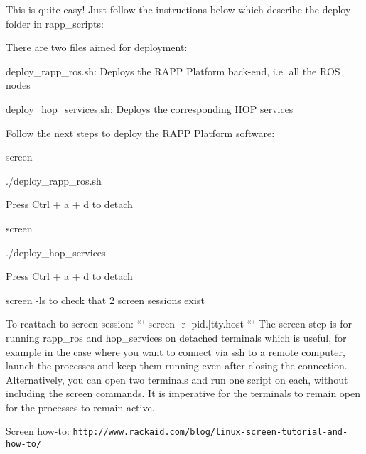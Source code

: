 This is quite easy! Just follow the instructions below which describe the {\ttfamily deploy} folder in {\ttfamily rapp\-\_\-scripts}\-:

There are two files aimed for deployment\-:


\begin{DoxyItemize}
\item {\ttfamily deploy\-\_\-rapp\-\_\-ros.\-sh}\-: Deploys the R\-A\-P\-P Platform back-\/end, i.\-e. all the R\-O\-S nodes
\item {\ttfamily deploy\-\_\-hop\-\_\-services.\-sh}\-: Deploys the corresponding H\-O\-P services
\end{DoxyItemize}

Follow the next steps to deploy the R\-A\-P\-P Platform software\-:


\begin{DoxyItemize}
\item {\ttfamily screen}
\item {\ttfamily ./deploy\-\_\-rapp\-\_\-ros.sh}
\item Press Ctrl + a + d to detach
\item {\ttfamily screen}
\item {\ttfamily ./deploy\-\_\-hop\-\_\-services}
\item Press Ctrl + a + d to detach
\item {\ttfamily screen -\/ls} to check that 2 screen sessions exist
\end{DoxyItemize}

To reattach to screen session\-: ``` screen -\/r \mbox{[}pid.\mbox{]}tty.\-host ``` The screen step is for running rapp\-\_\-ros and hop\-\_\-services on detached terminals which is useful, for example in the case where you want to connect via ssh to a remote computer, launch the processes and keep them running even after closing the connection. Alternatively, you can open two terminals and run one script on each, without including the screen commands. It is imperative for the terminals to remain open for the processes to remain active.

Screen how-\/to\-: \href{http://www.rackaid.com/blog/linux-screen-tutorial-and-how-to/}{\tt http\-://www.\-rackaid.\-com/blog/linux-\/screen-\/tutorial-\/and-\/how-\/to/} 